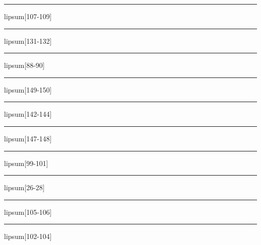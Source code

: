 \documentclass[11pt,a4paper]{article}
\begin{document}
\begin{simplewrap}
  \textcolor{purple!41}{\rule{5.8cm}{4.3cm}}
\end{simplewrap}
lipsum[107-109]

\begin{simplewrap}
  \textcolor{red!25}{\rule{4.4cm}{3.2cm}}
\end{simplewrap}
lipsum[131-132]

\begin{simplewrap}
  \textcolor{purple!14}{\rule{3.8cm}{8.3cm}}
\end{simplewrap}
lipsum[88-90]

\begin{simplewrap}
  \textcolor{cyan!27}{\rule{5.5cm}{4.3cm}}
\end{simplewrap}
lipsum[149-150]

\begin{simplewrap}
  \textcolor{red!19}{\rule{4.3cm}{5.9cm}}
\end{simplewrap}
lipsum[142-144]

\begin{simplewrap}
  \textcolor{pink!39}{\rule{5.8cm}{9.0cm}}
\end{simplewrap}
lipsum[147-148]

\begin{simplewrap}
  \textcolor{olive!12}{\rule{4.0cm}{5.8cm}}
\end{simplewrap}
lipsum[99-101]

\begin{simplewrap}
  \textcolor{purple!41}{\rule{5.9cm}{3.0cm}}
\end{simplewrap}
lipsum[26-28]

\begin{simplewrap}
  \textcolor{blue!16}{\rule{4.6cm}{5.7cm}}
\end{simplewrap}
lipsum[105-106]

\begin{simplewrap}
  \textcolor{purple!14}{\rule{4.4cm}{9.8cm}}
\end{simplewrap}
lipsum[102-104]
\end{document}
